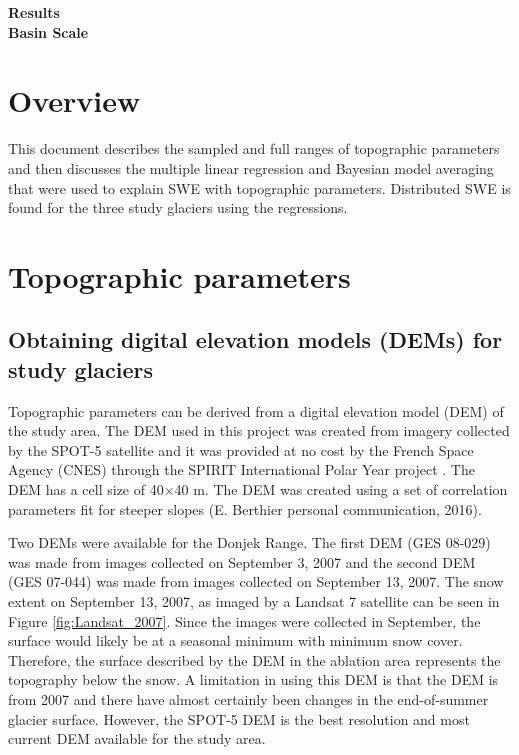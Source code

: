 \documentclass[12pt]{article}
\begin{document}

\begin{center}
\Large \textbf{Results\\ Basin Scale}
\end{center}

\section*{Overview}
This document describes the sampled and full ranges of topographic parameters and then discusses the multiple linear regression and Bayesian model averaging that were used to explain SWE with topographic parameters. Distributed SWE is found for the three study glaciers using the regressions. 

\tableofcontents
\pagebreak

\section{Topographic parameters}

\subsection{Obtaining digital elevation models (DEMs) for study glaciers}

Topographic parameters can be derived from a digital elevation model (DEM) of the study area. The DEM used in this project was created from imagery collected by the SPOT-5 satellite and it was provided at no cost by the French Space Agency (CNES) through the SPIRIT International Polar Year project \citep{Korona2009}. The DEM has a cell size of 40$\times$40 m. The DEM was created using a set of correlation parameters fit for steeper slopes (E. Berthier personal communication, 2016). 

Two DEMs were available for the Donjek Range. The first DEM (GES 08-029) was made from images collected on September 3, 2007 and the second DEM (GES 07-044) was made from images collected on September 13, 2007. The snow extent on September 13, 2007, as imaged by a Landsat 7 satellite can be seen in Figure \ref{fig:Landsat_2007}. Since the images were collected in September, the surface would likely be at a seasonal minimum with minimum snow cover. Therefore, the surface described by the DEM in the ablation area represents the topography below the snow. A limitation in using this DEM is that the DEM is from 2007 and there have almost certainly been changes in the end-of-summer glacier surface. However, the SPOT-5 DEM is the best resolution and most current DEM available for the study area. 
\end{document}
